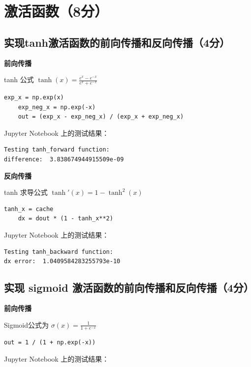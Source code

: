 \chapter{激活函数（8分）}

\section{实现tanh激活函数的前向传播和反向传播（4分）}

\textbf{前向传播}

tanh 公式 $\tanh(x) = \frac{e^x - e^{-x}}{e^x + e^{-x}}$

\begin{lstlisting}[style=cleanpython]
    exp_x = np.exp(x)
    exp_neg_x = np.exp(-x)
    out = (exp_x - exp_neg_x) / (exp_x + exp_neg_x)
\end{lstlisting}

Jupyter Notebook 上的测试结果：

\begin{lstlisting}[style=cleanpython]
Testing tanh_forward function:
difference:  3.838674944915509e-09
\end{lstlisting}

\textbf{反向传播}

tanh 求导公式 $\tanh'(x) = 1 - \tanh^2(x)$

\begin{lstlisting}[style=cleanpython]
    tanh_x = cache
    dx = dout * (1 - tanh_x**2)
\end{lstlisting}

Jupyter Notebook 上的测试结果：

\begin{lstlisting}[style=cleanpython]
Testing tanh_backward function:
dx error:  1.0409584283255793e-10
\end{lstlisting}

\section{实现 sigmoid 激活函数的前向传播和反向传播（4分）}

\textbf{前向传播}

Sigmoid公式为 $\sigma(x) = \frac{1}{1 + e^{-x}}$

\begin{lstlisting}[style=cleanpython]
    out = 1 / (1 + np.exp(-x))
\end{lstlisting}

Jupyter Notebook 上的测试结果：

